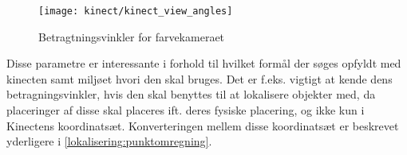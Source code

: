 \begin{figure}
\centering
\texttt{[image: kinect/kinect\_view\_angles]}
\caption{Betragtningsvinkler for farvekameraet}
\label{kinect:vinkler}
\end{figure}

Disse parametre er interessante i forhold til hvilket formål der søges opfyldt med kinecten samt miljøet hvori den skal bruges. 
Det er f.eks. vigtigt at kende dens betragningsvinkler, hvis den skal benyttes til at lokalisere objekter med, da placeringer af disse skal placeres ift. deres fysiske placering, og ikke kun i Kinectens koordinatsæt.
Konverteringen mellem disse koordinatsæt er beskrevet yderligere i \cref{lokalisering:punktomregning}.

%
%
